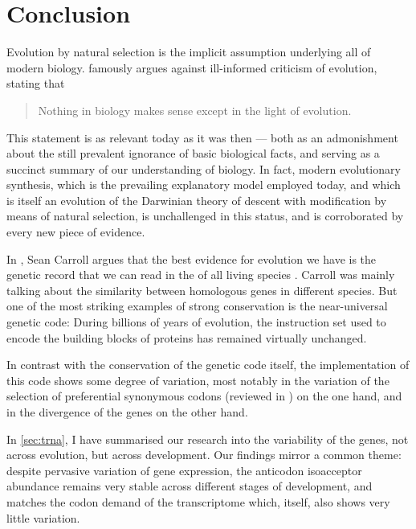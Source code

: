 \chapter{Conclusion}
\label{sec:conclusion}


\noindent
Evolution by natural selection is the implicit assumption underlying all of
modern biology. \citet{Dobzhansky:1973} famously argues against ill-informed
criticism of evolution, stating that

\begin{quote}
    Nothing in biology makes sense except in the light of evolution.
\end{quote}

This statement is as relevant today as it was then --- both as an admonishment
about the still prevalent ignorance of basic biological facts, and serving as a
succinct summary of our understanding of biology. In fact, modern evolutionary
synthesis, which is the prevailing explanatory model employed today, and which
is itself an evolution of the Darwinian theory of descent with modification by
means of natural selection, is unchallenged in this status, and is corroborated
by every new piece of evidence.

In , Sean Carroll argues that the best
evidence for evolution we have is the genetic record that we can read in the
\dna of all living species \citep{Carroll:2006}. Carroll was mainly talking
about the similarity between homologous genes in different species. But one of
the most striking examples of strong conservation is the near-universal genetic
code: During billions of years of evolution, the instruction set used to encode
the building blocks of proteins has remained virtually unchanged.

In contrast with the conservation of the genetic code itself, the implementation
of this code shows some degree of variation, most notably in the variation of
the selection of preferential synonymous codons (reviewed in
\citet{Ermolaeva:2001}) on the one hand, and in the divergence of the \trna
genes \citep{Kutter:2011} on the other hand.

In \cref{sec:trna}, I have summarised our research into the variability of the
\trna genes, not across evolution, but across development. Our findings mirror a
common theme: despite pervasive variation of \trna gene expression, the
anticodon isoacceptor \trna abundance remains very stable across different
stages of development, and matches the codon demand of the transcriptome which,
itself, also shows very little variation.

